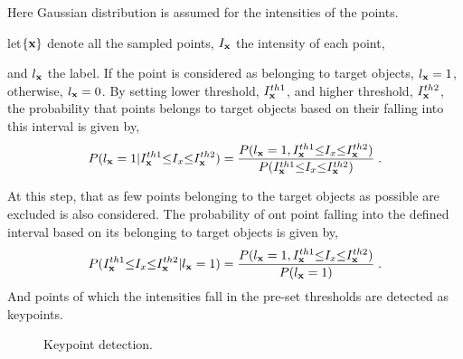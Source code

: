 Here Gaussian distribution is assumed for the intensities of the points.


let$\{\bf{x}\}$ denote all the sampled points, $I_{\bf{x}}$ the intensity of each point, 
and $l_{\bf{x}}$ the label. If the point is considered as belonging to target objects, $l_{\bf{x}}=1$, otherwise, $l_{\bf{x}}=0$. By setting lower threshold, $I^{th1}_{\bf{x}}$,  and higher threshold, $I^{th2}_{\bf{x}}$, the probability that points belongs to target objects based on their falling into this interval is given by,
\begin{equation}
P(l_{\bf{x}}=1|I^{th1}_{\bf{x}}{\leq}I_x{\leq}{I^{th2}_{\bf{x}}})=
\frac
{P(l_{\bf{x}}=1,I^{th1}_{\bf{x}}{\leq}I_x{\leq}{I^{th2}_{\bf{x}}})} {P(I^{th1}_{\bf{x}}{\leq}I_x{\leq}{I^{th2}_{\bf{x}}})}\;.
\label{eq1}
\end{equation}



At this step,  that as few points belonging to the target objects as possible are excluded is also considered. The probability of ont point falling into the defined interval based on its belonging to target objects is given by,
\begin{equation}
P(I^{th1}_{\bf{x}}{\leq}I_x{\leq}{I^{th2}_{\bf{x}}}|l_{\bf{x}}=1)=
\frac
{P(l_{\bf{x}}=1,I^{th1}_{\bf{x}}{\leq}I_x{\leq}{I^{th2}_{\bf{x}}})} {P(l_{\bf{x}}=1)}\;.
\label{eq1.1}
\end{equation}
And points of which the intensities fall in the pre-set thresholds are detected as keypoints.
\begin{figure}
\centering
{}
\caption[Keypoint detection]{Keypoint detection. }
\label{fig:sec}
\end{figure}


